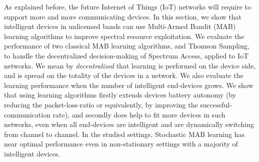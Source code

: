 
\graphicspath{{2-Chapters/4-Chapter/CrownCom_17.git/}}

As explained before, the future Internet of Things (IoT) networks will require to support more and more communicating devices.
In this section, we show that intelligent devices in unlicensed bands can use Multi-Armed Bandit (MAB) learning algorithms to improve spectral resource exploitation.
%
We evaluate the performance of two classical MAB learning algorithms, \UCB{} and Thomson Sampling, to handle the decentralized decision-making of Spectrum Access, applied to IoT networks.
We mean by \emph{decentralized} that learning is performed on the device side, and is spread on the totality of the devices in a network.
We also evaluate the learning performance when the number of intelligent end-devices grows.
%
We show that using learning algorithms
firstly extends devices battery autonomy (by reducing the packet-loss-ratio or equivalently, by improving the successful-communication rate),
and secondly does help to fit more devices in such networks, even when all end-devices are intelligent and are dynamically switching from channel to channel.
In the studied settings,
Stochastic MAB learning
has near optimal performance even in non-stationary settings with a majority of intelligent devices.



